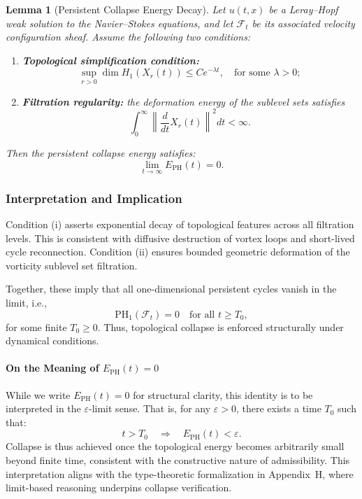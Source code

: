 \documentclass[11pt]{article}
\newtheorem{lemma}[theorem]{Lemma}
\begin{document}
\begin{lemma}[Persistent Collapse Energy Decay]
\label{lem:collapse-energy-decay}
Let \( u(t,x) \) be a Leray--Hopf weak solution to the Navier--Stokes equations, and let \( \mathcal{F}_t \) be its associated velocity configuration sheaf. Assume the following two conditions:
\begin{enumerate}
  \item[(i)] \textbf{Topological simplification condition:}
  \[
  \sup_{r > 0} \dim H_1(X_r(t)) \leq C e^{-\lambda t}, \quad \text{for some } \lambda > 0;
  \]
  \item[(ii)] \textbf{Filtration regularity:} the deformation energy of the sublevel sets satisfies
  \[
  \int_0^\infty \left\| \frac{d}{dt} X_r(t) \right\|^2 dt < \infty.
  \]
\end{enumerate}
Then the persistent collapse energy satisfies:
\[
\lim_{t \to \infty} E_{\mathrm{PH}}(t) = 0.
\]
\end{lemma}

\subsubsection*{Interpretation and Implication}

Condition (i) asserts exponential decay of topological features across all filtration levels. This is consistent with diffusive destruction of vortex loops and short-lived cycle reconnection. Condition (ii) ensures bounded geometric deformation of the vorticity sublevel set filtration.

Together, these imply that all one-dimensional persistent cycles vanish in the limit, i.e.,
\[
\mathrm{PH}_1(\mathcal{F}_t) = 0 \quad \text{for all } t \geq T_0,
\]
for some finite \( T_0 \geq 0 \). Thus, topological collapse is enforced structurally under dynamical conditions.

\paragraph{On the Meaning of \( E_{\mathrm{PH}}(t) = 0 \)}

While we write \( E_{\mathrm{PH}}(t) = 0 \) for structural clarity, this identity is to be interpreted in the $\varepsilon$-limit sense. That is, for any \( \varepsilon > 0 \), there exists a time \( T_0 \) such that:
\[
t > T_0 \quad \Rightarrow \quad E_{\mathrm{PH}}(t) < \varepsilon.
\]
Collapse is thus achieved once the topological energy becomes arbitrarily small beyond finite time, consistent with the constructive nature of admissibility. This interpretation aligns with the type-theoretic formalization in Appendix~H, where limit-based reasoning underpins collapse verification.
\end{document}
